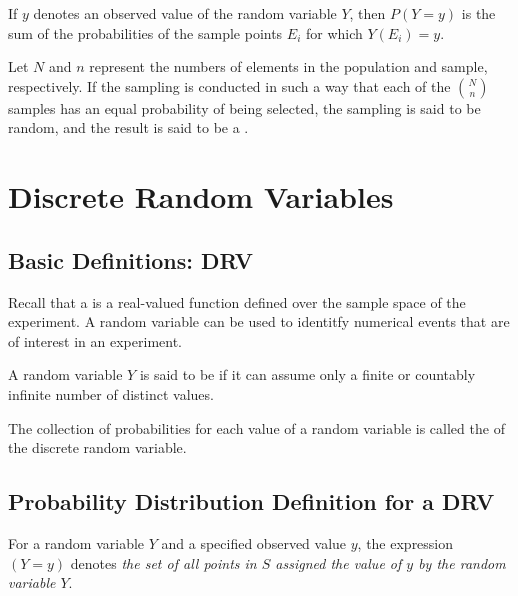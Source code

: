 \documentclass[12pt, a4paper, twoside, openright, titlepage]{book}
\begin{document}
\begin{rmk}{}{}
    If $y$ denotes an observed value of the random variable $Y$, then $P(Y=y)$ is the sum of the probabilities of the sample points $E_i$ for which $Y(E_i) = y$.
\end{rmk}

\begin{defn}{}{}
    Let $N$ and $n$ represent the numbers of elements in the population and sample, respectively. If the sampling is conducted in such a way that each of the $\binom{N}{n}$ samples has an equal probability of being selected, the sampling is said to be random, and the result is said to be a .
\end{defn}


\chapter{Discrete Random Variables}


\section{\textsection Basic Definitions: DRV}

\begin{rec}{}{}
    Recall that a  is a real-valued function defined over the sample space of the experiment. A random variable can be used to identitfy numerical events that are of interest in an experiment. 
\end{rec}


\begin{defn}{}{}
    A random variable $Y$ is said to be  if it can assume only a finite or countably infinite number of distinct values.
\end{defn}


\begin{rmk}{}{}
    The collection of probabilities for each value of a random variable is called the  of the discrete random variable.
\end{rmk}

\section{\textsection Probability Distribution Definition for a DRV}

\begin{nota}{}{}
    For a random variable $Y$ and a specified observed value $y$, the expression $(Y=y)$ denotes \emph{the set of all points in $S$ assigned the value of $y$ by the random variable $Y$}.
\end{nota}
\end{document}
